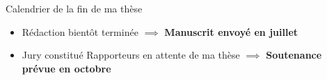\documentclass[11pt,english,ignorenonframetext,]{beamer}
\providecommand{\tightlist}{%
  \setlength{\itemsep}{0pt}\setlength{\parskip}{0pt}}
\begin{document}
\begin{frame}{Calendrier de la fin de ma thèse}


\begin{itemize}
\item
  Rédaction bientôt terminée
  \newline
  $\implies$ \textbf{Manuscrit envoyé en juillet}
\vspace*{20pt}
\item
  Jury constitué
  \newline
  Rapporteurs en attente de ma thèse
  \newline
  $\implies$ \textbf{Soutenance prévue en octobre}
\end{itemize}





\end{frame}





\end{document}
